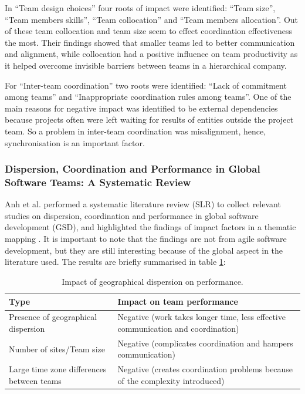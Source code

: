 In ``Team design choices'' four roots of impact were identified: ``Team size'', ``Team members skills'', ``Team collocation'' and ``Team members allocation''. Out of these team collocation and team size seem to effect coordination effectiveness the most. Their findings showed that smaller teams led to better communication and alignment, while collocation had a positive influence on team productivity as it helped overcome invisible barriers between teams in a hierarchical company.

For ``Inter-team coordination'' two roots were identified: ``Lack of commitment among teams'' and ``Inappropriate coordination rules among teams''. One of the main reasons for negative impact was identified to be external dependencies because projects often were left waiting for results of entities outside the project team. So a problem in inter-team coordination was misalignment, hence, synchronisation is an important factor.

\subsubsection{Dispersion, Coordination and Performance in Global Software Teams: A Systematic Review}

Anh et al. performed a systematic literature review (SLR) to collect relevant studies on dispersion, coordination and performance in global software development (GSD), and highlighted the findings of impact factors in a thematic mapping \cite{Anh2012}. It is important to note that the findings are not from agile software development, but they are still interesting because of the global aspect in the literature used. The results are briefly summarised in table \ref{GSD}:

\begin{table}[H]
\begin{center}
    \begin{tabular}{ | p{5cm} | p{8cm} |}
    \hline
    \textbf{Type} & \textbf{Impact on team performance} \\ \hline
    Presence of geographical dispersion & Negative (work takes longer time, less effective communication and coordination) \\ \hline
    Number of sites/Team size & Negative (complicates coordination and hampers communication) \\ \hline
    Large time zone differences between teams & Negative (creates coordination problems because of the complexity introduced) \\ \hline
    \end{tabular}
    \caption{Impact of geographical dispersion on performance.}
    \label{GSD}
\end{center}
\end{table}

